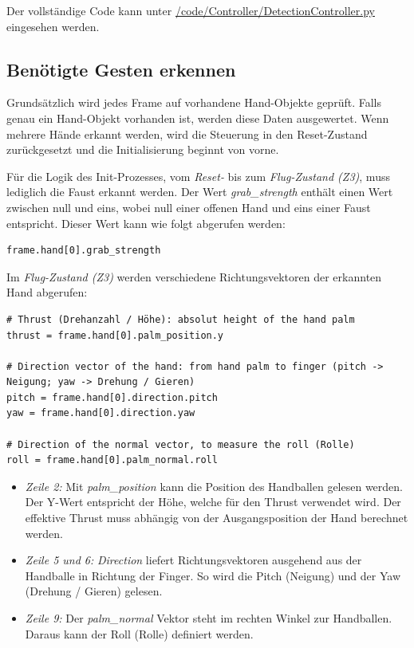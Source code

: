 Der vollständige Code kann unter \href{https://github.com/MrJack91/droneGestures/blob/master/code/Controller/DetectionController.py}{/code/Controller/DetectionController.py} eingesehen werden.

\subsection{Benötigte Gesten erkennen}
Grundsätzlich wird jedes Frame auf vorhandene Hand-Objekte geprüft.
Falls genau ein Hand-Objekt vorhanden ist, werden diese Daten ausgewertet. Wenn mehrere Hände erkannt werden, wird die Steuerung in den Reset-Zustand zurückgesetzt und die Initialisierung beginnt von vorne.

Für die Logik des Init-Prozesses, vom \textit{Reset-} bis zum \textit{Flug-Zustand (Z3)}, muss lediglich die Faust erkannt werden.
Der Wert \textit{grab\_strength} enthält einen Wert zwischen null und eins, wobei null einer offenen Hand und eins einer Faust entspricht.
Dieser Wert kann wie folgt abgerufen werden:

\begin{lstlisting}[style=lstStyleCpp]
frame.hand[0].grab_strength
\end{lstlisting}

Im \textit{Flug-Zustand (Z3)} werden verschiedene Richtungsvektoren der erkannten Hand abgerufen:

\begin{lstlisting}[style=lstStyleCpp]
# Thrust (Drehanzahl / Höhe): absolut height of the hand palm
thrust = frame.hand[0].palm_position.y

# Direction vector of the hand: from hand palm to finger (pitch -> Neigung; yaw -> Drehung / Gieren)
pitch = frame.hand[0].direction.pitch
yaw = frame.hand[0].direction.yaw

# Direction of the normal vector, to measure the roll (Rolle)
roll = frame.hand[0].palm_normal.roll
\end{lstlisting}

\begin{itemize}
	\item \textit{Zeile 2:}
	Mit \textit{palm\_position} kann die Position des Handballen gelesen werden.
	Der Y-Wert entspricht der Höhe, welche für den Thrust verwendet wird.
	Der effektive Thrust muss abhängig von der Ausgangsposition der Hand berechnet werden.

	\item \textit{Zeile 5 und 6:}
	\textit{Direction} liefert Richtungsvektoren ausgehend aus der Handballe in Richtung der Finger. So wird die Pitch (Neigung) und der Yaw (Drehung / Gieren) gelesen.

	\item \textit{Zeile 9:}
	Der \textit{palm\_normal} Vektor steht im rechten Winkel zur Handballen. Daraus kann der Roll (Rolle) definiert werden.
\end{itemize}

